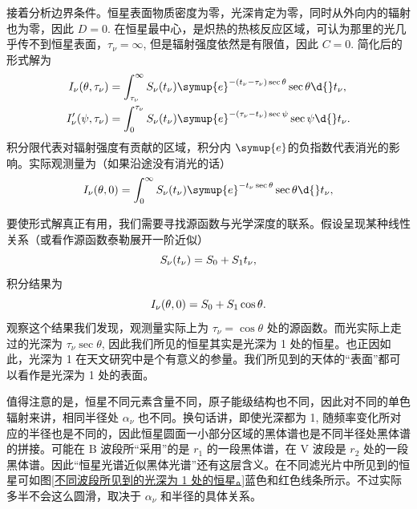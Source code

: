 \documentclass[../天体物理基础.tex]{subfiles}
\begin{document}
接着分析边界条件。恒星表面物质密度为零，光深肯定为零，同时从外向内的辐射也为零，因此 $D=0$. 在恒星最中心，是炽热的热核反应区域，可认为那里的光几乎传不到恒星表面，$\tau_{\nu}=\infty$, 但是辐射强度依然是有限值，因此 $C=0$. 简化后的形式解为
\begin{align}
I_{\nu}\mleft(\theta,\tau_{\nu}\mright)&=\int_{\tau_{\nu}}^{\infty}S_{\nu}\mleft(t_{\nu}\mright)\symup{e}^{-\mleft(t_{\nu}-\tau_{\nu}\mright)\sec{\theta}}\sec{\theta}\d{}t_{\nu},\\
I_{\nu}'\mleft(\psi,\tau_{\nu}\mright)&=\int_{0}^{\tau_{\nu}}S_{\nu}\mleft(t_{\nu}\mright)\symup{e}^{-\mleft(\tau_{\nu}-t_{\nu}\mright)\sec{\psi}}\sec{\psi}\d{}t_{\nu}.
\end{align}
积分限代表对辐射强度有贡献的区域，积分内 $\symup{e}$ ​的负指数代表消光的影响。实际观测量为（如果沿途没有消光的话）
\begin{equation}
I_{\nu}\mleft(\theta, 0\mright)=\int_{0}^{\infty}S_{\nu}\mleft(t_{\nu}\mright)\symup{e}^{-t_{\nu}\sec{\theta}}\sec{\theta}\d{}t_{\nu},
\end{equation}

要使形式解真正有用，我们需要寻找源函数与光学深度的联系。假设呈现某种线性关系（或看作源函数泰勒展开一阶近似）
\begin{equation}
S_{\nu}\mleft(t_{\nu}\mright)=S_{0}+S_{1}t_{\nu},
\end{equation}
积分结果为
\begin{equation}
I_{\nu}\mleft(\theta, 0\mright)=S_{0}+S_{1}\cos{\theta}.
\end{equation}
观察这个结果我们发现，观测量实际上为 $\tau_{\nu}=\cos{\theta}$ 处的源函数。而光实际上走过的光深为 $\tau_{\nu}\sec{\theta}$, 因此我们所见的恒星其实是光深为 1 处的恒星。也正因如此，光深为 1 在天文研究中是个有意义的参量。我们所见到的天体的“表面”都可以看作是光深为 1 处的表面。

值得注意的是，恒星不同元素含量不同，原子能级结构也不同，因此对不同的单色辐射来讲，相同半径处 $\alpha_{\nu}$ 也不同。换句话讲，即使光深都为 1, 随频率变化所对应的半径也是不同的，因此恒星圆面一小部分区域的黑体谱也是不同半径处黑体谱的拼接。可能在 B 波段所“采用”的是 $r_{1}$ 的一段黑体谱，在 V 波段是 $r_{2}$ 处的一段黑体谱。因此“恒星光谱近似黑体光谱”还有这层含义。在不同滤光片中所见到的恒星可如图\ref{不同波段所见到的光深为 1 处的恒星。}蓝色和红色线条所示。不过实际多半不会这么圆滑，取决于 $\alpha_{\nu}$ 和半径的具体关系。
\end{document}
